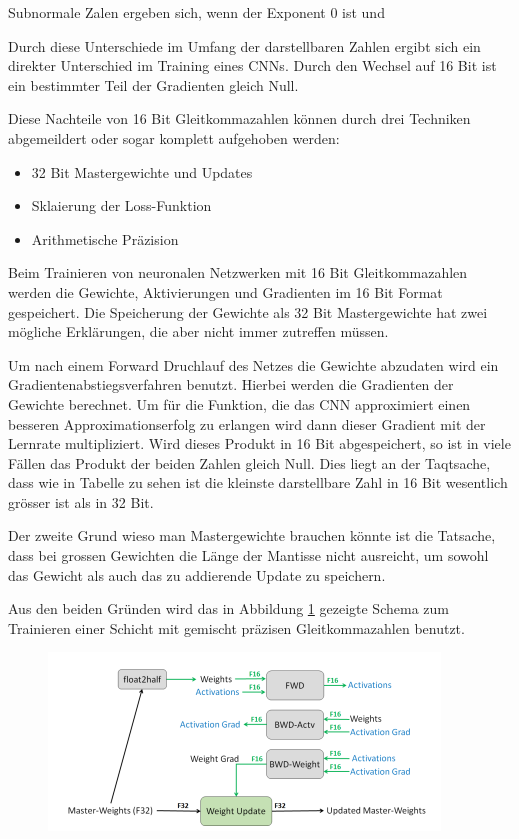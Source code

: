 Subnormale Zalen ergeben sich, wenn der Exponent 0 ist und 

Durch diese Unterschiede im Umfang der darstellbaren Zahlen ergibt sich ein direkter Unterschied im Training eines CNNs. Durch den Wechsel auf 16 Bit ist ein bestimmter Teil der Gradienten gleich Null. 

Diese Nachteile von 16 Bit Gleitkommazahlen können durch drei Techniken abgemeildert oder sogar komplett aufgehoben werden:
\begin{itemize}
 \item 32 Bit Mastergewichte und Updates
 \item Sklaierung der Loss-Funktion
 \item Arithmetische Präzision 
\end{itemize}

Beim Trainieren von neuronalen Netzwerken mit 16 Bit Gleitkommazahlen werden die Gewichte, Aktivierungen und Gradienten im 16 Bit Format gespeichert. Die Speicherung der Gewichte als 32 Bit Mastergewichte hat zwei mögliche Erklärungen, die aber nicht immer zutreffen müssen. 

Um nach einem Forward Druchlauf des Netzes die Gewichte abzudaten wird ein Gradientenabstiegsverfahren benutzt. Hierbei werden die Gradienten der Gewichte berechnet. Um für die Funktion, die das CNN approximiert einen besseren Approximationserfolg zu erlangen wird dann dieser Gradient mit der Lernrate multipliziert. Wird dieses Produkt in 16 Bit abgespeichert, so ist in viele Fällen das Produkt der beiden Zahlen gleich Null. Dies liegt an der Taqtsache, dass wie in Tabelle  zu sehen ist die kleinste darstellbare Zahl in 16 Bit wesentlich grösser ist als in 32 Bit.


Der zweite Grund wieso man Mastergewichte brauchen könnte ist die Tatsache, dass bei grossen Gewichten die Länge der Mantisse nicht ausreicht, um sowohl das Gewicht als auch das zu  addierende Update zu speichern.

Aus den beiden Gründen wird das in Abbildung \ref{abb:mixed} gezeigte Schema zum Trainieren einer Schicht mit gemischt präzisen Gleitkommazahlen benutzt.

\begin{figure}[h]
 \centering
 \includegraphics[width=0.8 \textwidth]{KapitelPartA/images/mixed.png}
 \label{abb:mixed}
\end{figure}



